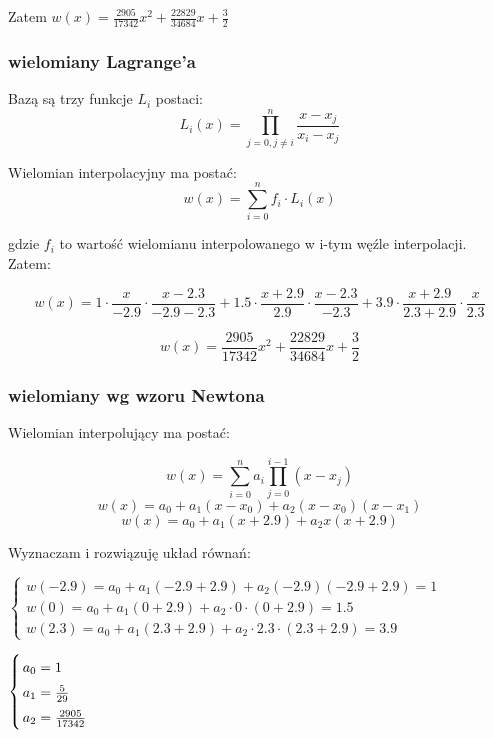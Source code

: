 \documentclass[5]{article}
\begin{document}
\begin{flushleft}
Zatem $w(x)=\frac{2905}{17342}x^2+\frac{22829}{34684}x+\frac{3}{2}$
\end{flushleft}

\subsubsection{wielomiany Lagrange'a}

Bazą są trzy funkcje $L_{i}$ postaci:
\[L_{i}(x)=\prod_{j=0, j\neq i}^{n}\frac{x-x_{j}}{x_{i}-x_{j}}\]

Wielomian interpolacyjny ma postać:
\[w(x)=\sum_{i=0}^{n}f_{i}\cdot L_{i}(x)\]

gdzie $f_{i}$ to wartość wielomianu interpolowanego w i-tym węźle interpolacji. Zatem:

\[w(x)=1\cdot \frac{x}{-2.9}\cdot \frac{x-2.3}{-2.9-2.3}+1.5\cdot \frac{x+2.9}{2.9}\cdot \frac{x-2.3}{-2.3}+3.9\cdot \frac{x+2.9}{2.3+2.9}\cdot \frac{x}{2.3}\]

\[w(x)=\frac{2905}{17342}x^2+\frac{22829}{34684}x+\frac{3}{2}\]

\subsubsection{wielomiany wg wzoru Newtona}

Wielomian interpolujący ma postać:

\[w(x)=\sum_{i=0}^{n}a_{i}\prod_{j=0}^{i-1}(x-x_{j})\]
\[w(x)=a_{0}+a_{1}(x-x_{0})+a_{2}(x-x_{0})(x-x_{1})\]
\[w(x)=a_{0}+a_{1}(x+2.9)+a_{2}x(x+2.9)\]

\begin{flushleft}
Wyznaczam i rozwiązuję układ równań:
\end{flushleft}

\begin{flushleft}
$
\left\{ \begin{array}{ll}
w(-2.9)=a_{0}+a_{1}(-2.9+2.9)+a_{2}(-2.9)(-2.9+2.9)=1\\
w(0)=a_{0}+a_{1}(0+2.9)+a_{2}\cdot 0 \cdot(0+2.9)=1.5\\
w(2.3)=a_{0}+a_{1}(2.3+2.9)+a_{2}\cdot 2.3 \cdot(2.3+2.9)=3.9
\end{array} \right.
$
\end{flushleft}

\begin{flushleft}
$
\left\{
\arraycolsep=1.4pt\def\arraystretch{1.5}
\begin{array}{ll}
a_{0}=1\\
a_{1}=\frac{5}{29}\\
a_{2}=\frac{2905}{17342}
\end{array} \right.
$
\end{flushleft}
\end{document}
